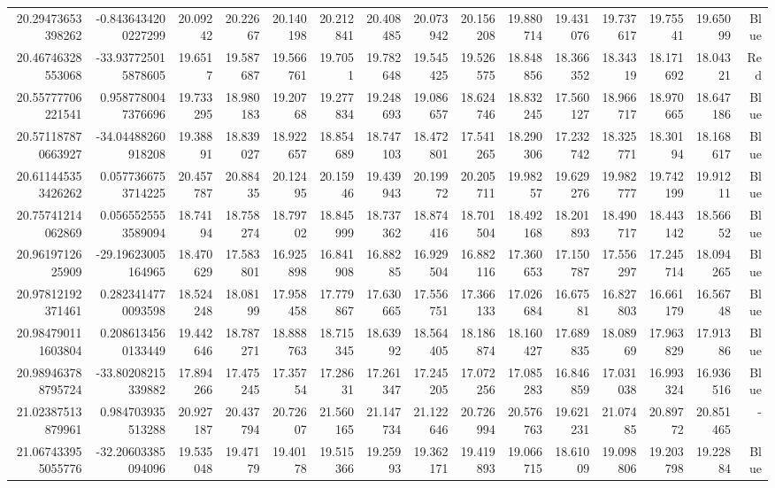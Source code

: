 \begin{center}
\begin{longtable}{rrrrrrrrrrrrrrr}
20.29473653398262 & -0.8436434200227299 & 20.09242 & 20.22667 & 20.140198 & 20.212841 & 20.408485 & 20.073942 & 20.156208 & 19.880714 & 19.431076 & 19.737617 & 19.75541 & 19.65099 & Blue \\
20.46746328553068 & -33.937725015878605 & 19.6517 & 19.587687 & 19.566761 & 19.7051 & 19.782648 & 19.545425 & 19.526575 & 18.848856 & 18.366352 & 18.34319 & 18.171692 & 18.04321 & Red \\
20.55777706221541 & 0.9587780047376696 & 19.733295 & 18.980183 & 19.20768 & 19.277834 & 19.248693 & 19.086657 & 18.624746 & 18.832245 & 17.560127 & 18.966717 & 18.970665 & 18.647186 & Blue \\
20.571187870663927 & -34.04488260918208 & 19.38891 & 18.839027 & 18.922657 & 18.854689 & 18.747103 & 18.472801 & 17.541265 & 18.290306 & 17.232742 & 18.325771 & 18.30194 & 18.168617 & Blue \\
20.611445353426262 & 0.0577366753714225 & 20.457787 & 20.88435 & 20.12495 & 20.15946 & 19.439943 & 20.19972 & 20.205711 & 19.98257 & 19.629276 & 19.982777 & 19.742199 & 19.91211 & Blue \\
20.75741214062869 & 0.0565525553589094 & 18.74194 & 18.758274 & 18.79702 & 18.845999 & 18.737362 & 18.874416 & 18.701504 & 18.492168 & 18.201893 & 18.490717 & 18.443142 & 18.56652 & Blue \\
20.9619712625909 & -29.19623005164965 & 18.470629 & 17.583801 & 16.925898 & 16.841908 & 16.88285 & 16.929504 & 16.882116 & 17.360653 & 17.150787 & 17.556297 & 17.245714 & 18.094265 & Blue \\
20.97812192371461 & 0.2823414770093598 & 18.524248 & 18.08199 & 17.958458 & 17.779867 & 17.630665 & 17.556751 & 17.366133 & 17.026684 & 16.67581 & 16.827803 & 16.661179 & 16.56748 & Blue \\
20.984790111603804 & 0.2086134560133449 & 19.442646 & 18.787271 & 18.888763 & 18.715345 & 18.63992 & 18.564405 & 18.186874 & 18.160427 & 17.689835 & 18.08969 & 17.963829 & 17.91386 & Blue \\
20.989463788795724 & -33.80208215339882 & 17.894266 & 17.475245 & 17.35754 & 17.28631 & 17.261347 & 17.245205 & 17.072256 & 17.085283 & 16.846859 & 17.031038 & 16.993324 & 16.936516 & Blue \\
21.02387513879961 & 0.984703935513288 & 20.927187 & 20.437794 & 20.72607 & 21.560165 & 21.147734 & 21.122646 & 20.726994 & 20.576763 & 19.621231 & 21.07485 & 20.89772 & 20.851465 & - \\
21.067433955055776 & -32.20603385094096 & 19.535048 & 19.47179 & 19.40178 & 19.515366 & 19.25993 & 19.362171 & 19.419893 & 19.066715 & 18.61009 & 19.098806 & 19.203798 & 19.22884 & Blue \\

\end{longtable}
\end{center}
